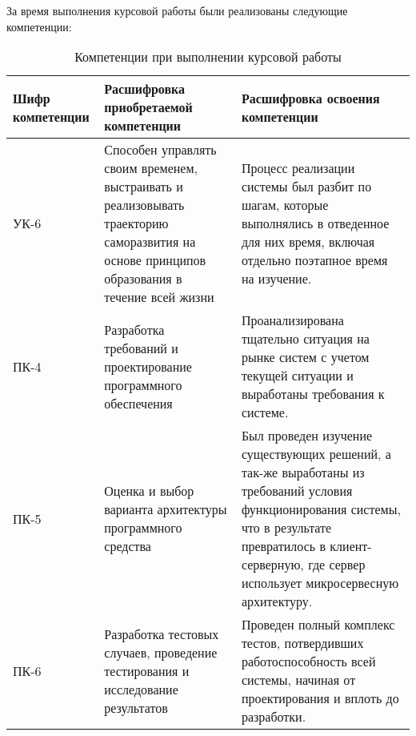 \newpage
За время выполнения курсовой работы были реализованы следующие компетенции:
\begin{table}[h!]
\centering
\begin{tabular}{|p{3cm}|p{5cm}|p{7cm}|} 
    \hline
    Шифр \newline компетенции & Расшифровка \newline приобретаемой \newline компетенции & Расшифровка освоения \newline компетенции \\[0.5ex] 
        \hline
        УК-6 & Способен управлять своим временем, выстраивать и реализовывать траекторию саморазвития на основе принципов образования в течение всей жизни &  Процесс реализации системы был разбит по шагам, которые выполнялись в отведенное для них время, включая отдельно поэтапное время на изучение.  \\ \hline
        ПК-4 & Разработка требований и проектирование программного обеспечения & Проанализирована тщательно ситуация на рынке систем с учетом текущей ситуации и выработаны требования к системе. \\  \hline
        ПК-5 & Оценка и выбор варианта архитектуры программного средства & Был проведен изучение существующих решений, а так-же выработаны из требований условия функционирования системы, что в результате превратилось в клиент-серверную, где сервер использует микросервесную архитектуру. \\  \hline
        ПК-6 & Разработка тестовых случаев, проведение тестирования и исследование результатов & Проведен полный комплекс тестов, потвердивших работоспособность всей системы, начиная от проектирования и вплоть до разработки.\\ 
 \hline
\end{tabular}
\caption{Компетенции при выполнении курсовой работы}
\label{table:1}
\end{table}

